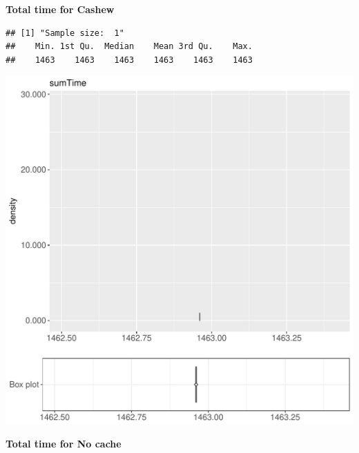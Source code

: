 \documentclass{article}\usepackage[]{graphicx}\usepackage[]{color}
\makeatletter
\def\maxwidth{ %
  \ifdim\Gin@nat@width>\linewidth
    \linewidth
  \else
    \Gin@nat@width
  \fi
}
\newenvironment{kframe}{%
 \def\at@end@of@kframe{}%
 \ifinner\ifhmode%
  \def\at@end@of@kframe{\end{minipage}}%
  \begin{minipage}{\columnwidth}%
 \fi\fi%
 \def\FrameCommand##1{\hskip\@totalleftmargin \hskip-\fboxsep
 \colorbox{shadecolor}{##1}\hskip-\fboxsep
     \hskip-\linewidth \hskip-\@totalleftmargin \hskip\columnwidth}%
 \MakeFramed {\advance\hsize-\width
   \@totalleftmargin\z@ \linewidth\hsize
   \@setminipage}}%
 {\par\unskip\endMakeFramed%
 \at@end@of@kframe}
\newenvironment{knitrout}{}{} %
\makeatother
\begin{document}
 \textbf{Total time for Cashew}
\begin{knitrout}
\color{fgcolor}\begin{kframe}
\begin{verbatim}
## [1] "Sample size:  1"
##    Min. 1st Qu.  Median    Mean 3rd Qu.    Max. 
##    1463    1463    1463    1463    1463    1463
\end{verbatim}


{\ttfamily\noindent\bfseries{}}\end{kframe}
\includegraphics[width=\maxwidth]{figure/RH1_cashew_obscure-1} 

\end{knitrout}
 \textbf{Total time for No cache}
\end{document}
